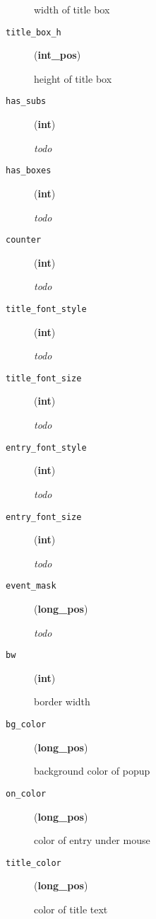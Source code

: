 \begin{description}
width of title box

\item[{\texttt{title\_box\_h}}] \leavevmode (\textbf{int\_pos})

height of title box

\item[{\texttt{has\_subs}}] \leavevmode (\textbf{int})

\emph{todo}

\item[{\texttt{has\_boxes}}] \leavevmode (\textbf{int})

\emph{todo}

\item[{\texttt{counter}}] \leavevmode (\textbf{int})

\emph{todo}

\item[{\texttt{title\_font\_style}}] \leavevmode (\textbf{int})

\emph{todo}

\item[{\texttt{title\_font\_size}}] \leavevmode (\textbf{int})

\emph{todo}

\item[{\texttt{entry\_font\_style}}] \leavevmode (\textbf{int})

\emph{todo}

\item[{\texttt{entry\_font\_size}}] \leavevmode (\textbf{int})

\emph{todo}

\item[{\texttt{event\_mask}}] \leavevmode (\textbf{long\_pos})

\emph{todo}

\item[{\texttt{bw}}] \leavevmode (\textbf{int})

border width

\item[{\texttt{bg\_color}}] \leavevmode (\textbf{long\_pos})

background color of popup

\item[{\texttt{on\_color}}] \leavevmode (\textbf{long\_pos})

color of entry under mouse

\item[{\texttt{title\_color}}] \leavevmode (\textbf{long\_pos})

color of title text


\end{description}
